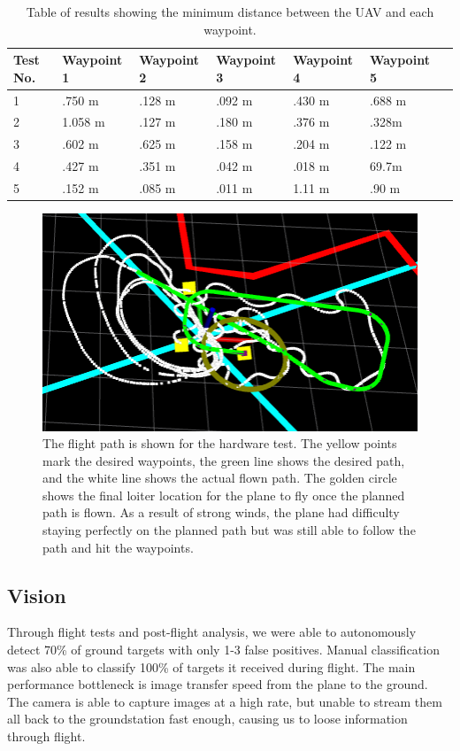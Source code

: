 \documentclass[]{auvsi_doc}
\begin{document}
\begin{table}[h!]

\caption{Table of results showing the minimum distance between the UAV and each waypoint.}
\label{tab:con_res}
\begin{tabular} {|l|l|l|l|l|l|l|}
\hline
Test No. & Waypoint 1&Waypoint 2&Waypoint 3&Waypoint 4&Waypoint 5\\
\hline
1 & .750 m& .128 m& .092 m& .430 m& .688 m \\
2 & 1.058 m &.127 m & .180 m & .376 m & .328m \\
3& .602 m& .625 m&.158 m& .204 m& .122 m\\
4& .427 m & .351 m & .042 m & .018 m& 69.7m\\
5& .152 m& .085 m& .011 m & 1.11 m & .90 m\\
\hline
\end{tabular}
\end{table}

\begin{figure}
    \centering
    \includegraphics[width=.75\textwidth]{WaypointTest.png}
    \caption{The flight path is shown for the hardware test. The yellow points mark the desired waypoints, the green line shows the desired path, and the white line shows the actual flown path. The golden circle shows the final loiter location for the plane to fly once the planned path is flown. As a result of strong winds, the plane had difficulty staying perfectly on the planned path but was still able to follow the path and hit the waypoints.}
    \label{fig:flight}
\end{figure}

\subsection{Vision}

Through flight tests and post-flight analysis, we were able to autonomously detect 70\% of ground targets with only 1-3 false positives. Manual classification was also able to classify 100\% of targets it received during flight. The main performance bottleneck is image transfer speed from the plane to the ground. The camera is able to capture images at a high rate, but unable to stream them all back to the groundstation fast enough, causing us to loose information through flight.
\end{document}
